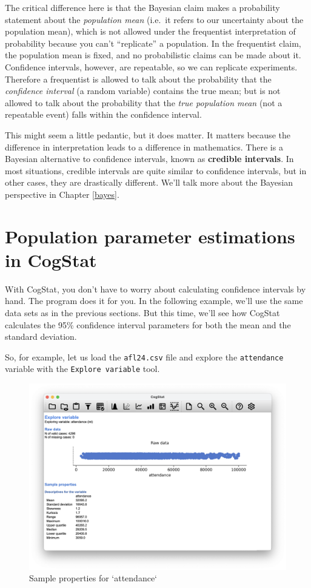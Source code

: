 \documentclass[
  11pt,
  a4paper,
  twoside,symmetric,openright]{book}
\theoremstyle{break}
\theoremstyle{break}
\begin{document}
The critical difference here is that the Bayesian claim makes a probability statement about the \emph{population mean} (i.e.~it refers to our uncertainty about the population mean), which is not allowed under the frequentist interpretation of probability because you can't ``replicate'' a population. In the frequentist claim, the population mean is fixed, and no probabilistic claims can be made about it. Confidence intervals, however, are repeatable, so we can replicate experiments. Therefore a frequentist is allowed to talk about the probability that the \emph{confidence interval} (a random variable) contains the true mean; but is not allowed to talk about the probability that the \emph{true population mean} (not a repeatable event) falls within the confidence interval.

This might seem a little pedantic, but it does matter. It matters because the difference in interpretation leads to a difference in mathematics. There is a Bayesian alternative to confidence intervals, known as \textbf{credible intervals}. In most situations, credible intervals are quite similar to confidence intervals, but in other cases, they are drastically different. We'll talk more about the Bayesian perspective in Chapter \ref{bayes}.

\section{Population parameter estimations in CogStat}\label{population-parameter-estimations-in-cogstat}

With CogStat, you don't have to worry about calculating confidence intervals by hand. The program does it for you. In the following example, we'll use the same data sets as in the previous sections. But this time, we'll see how CogStat calculates the 95\% confidence interval parameters for both the mean and the standard deviation.

So, for example, let us load the \texttt{afl24.csv} file and explore the \texttt{attendance} variable with the \texttt{Explore\ variable} tool.

\begin{figure}

{\centering \includegraphics[width=0.6\linewidth]{resources/image/cogstatattendancesample} 

}

\caption{Sample properties for `attendance`}\label{fig:unnamed-chunk-30}
\end{figure}
\end{document}

